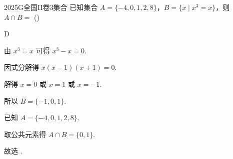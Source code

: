 
\begin{problem}{2025}{G}{全国II卷}{3}{集合}
已知集合 $A=\{-4,0,1,2,8\}$，$B=\{x \mid x^3=x\}$，则 $A \cap B =$
(\hspace{1cm})
\begin{choices}
\end{choices}
\end{problem}

\begin{answer}
D
\end{answer}

\begin{solutions}
由 $x^3 = x$ 可得 $x^3 - x = 0$.

因式分解得 $x(x-1)(x+1) = 0$.

解得 $x = 0$ 或 $x = 1$ 或 $x = -1$.

所以 $B = \{-1, 0, 1\}$.

已知 $A = \{-4, 0, 1, 2, 8\}$.

取公共元素得 $A \cap B = \{0, 1\}$.

故选 .
\end{solutions}